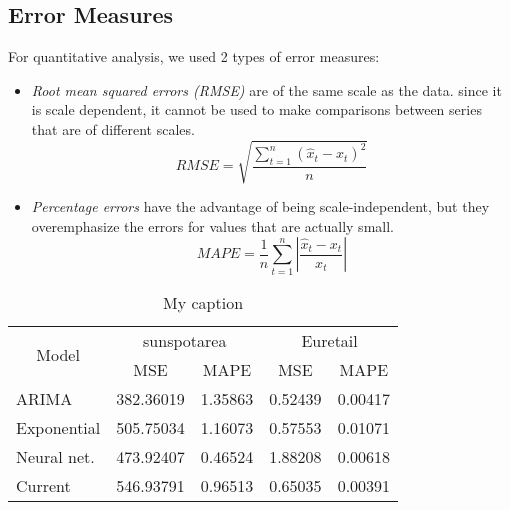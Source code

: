\subsection{Error Measures}
For quantitative analysis, we used 2 types of error measures:

\begin{itemize}
\item \textit{Root mean squared errors (RMSE)} are of the same scale as the data. since it is scale dependent, it cannot be used to make comparisons between series that are of different scales. \cite{forecasting_otexts}
$$RMSE=\sqrt{\frac{\sum_{t=1}^{n}(\hat{x}_{t}-x_{t})^{2}}{n}}$$
\item \textit{Percentage errors} have the advantage of being scale-independent, but they overemphasize the errors for values that are actually small.
$$MAPE=\frac{1}{n}\sum_{t=1}^{n}\left | \frac{\hat{x}_{t}-x_{t}}{x_{t}} \right |$$
\end{itemize}

\begin{table}[]
\centering
\caption{My caption}
\label{my-label}
\begin{tabular}{|l|l|r|r|r|}
\hline
\multicolumn{1}{|c|}{\multirow{2}{*}{Model}} & \multicolumn{2}{c|}{sunspotarea}                     & \multicolumn{2}{c|}{Euretail}                        \\ \cline{2-5} 
\multicolumn{1}{|c|}{}                       & \multicolumn{1}{c|}{MSE} & \multicolumn{1}{c|}{MAPE} & \multicolumn{1}{c|}{MSE} & \multicolumn{1}{c|}{MAPE} \\ \hline
ARIMA                                        & 382.36019                & 1.35863                   & 0.52439                  & 0.00417                   \\ \hline
Exponential                                  & 505.75034                & 1.16073                   & 0.57553                  & 0.01071                   \\ \hline
Neural net.                                         & 473.92407                & 0.46524                   & 1.88208                  & 0.00618                   \\ \hline
Current                                      & 546.93791                & 0.96513                   & 0.65035                  & 0.00391                   \\ \hline
\end{tabular}
\end{table}

